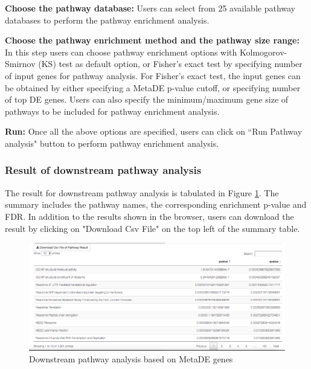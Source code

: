 \begin{steps}
\item \textbf{Choose the pathway database:}
Users can select from 25 available pathway databases to perform the pathway enrichment analysis. 

\item \textbf{Choose the pathway enrichment method and the pathway size range:}
In this step users can choose pathway enrichment options with Kolmogorov-Smirnov (KS) test as default option,
or Fisher's exact test by specifying number of input genes for pathway analysis.
For Fisher's exact test, the input genes can be obtained by either specifying a MetaDE p-value cutoff, or specifying number of top DE genes.
Users can also specify the minimum/maximum gene size of pathways to be included for pathway enrichment analysis.

\item \textbf{Run:}
Once all the above options are specified, users can click on ``Run Pathway analysis" button to perform pathway enrichment analysis.

\end{steps}


\subsubsection{Result of downstream pathway analysis}

The result for downstream pathway analysis  is tabulated in Figure \ref{fig:MetaDEresult2}. 
The summary includes the pathway names, the corresponding enrichment p-value and FDR. 
In addition to the results shown in the browser, 
users can download the result by clicking on "Download Csv File" on the top left of the summary table. 

\begin{figure}[H]
\begin{center}
\includegraphics[scale=0.4]{./figure/metaDE/MetaDE_pathway.png}
\caption{Downstream pathway analysis based on MetaDE genes}
\label{fig:MetaDEresult2}
\end{center}
\end{figure}



